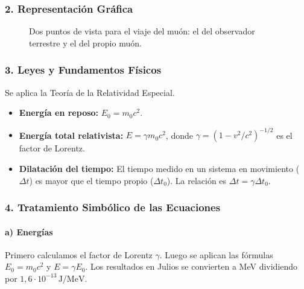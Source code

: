 \subsubsection*{2. Representación Gráfica}
\begin{figure}[H]
    \centering
    \caption{Dos puntos de vista para el viaje del muón: el del observador terrestre y el del propio muón.}
\end{figure}

\subsubsection*{3. Leyes y Fundamentos Físicos}
Se aplica la Teoría de la Relatividad Especial.
\begin{itemize}
    \item \textbf{Energía en reposo:} $E_0 = m_0c^2$.
    \item \textbf{Energía total relativista:} $E = \gamma m_0c^2$, donde $\gamma = (1-v^2/c^2)^{-1/2}$ es el factor de Lorentz.
    \item \textbf{Dilatación del tiempo:} El tiempo medido en un sistema en movimiento ($\Delta t$) es mayor que el tiempo propio ($\Delta t_0$). La relación es $\Delta t = \gamma \Delta t_0$.
\end{itemize}

\subsubsection*{4. Tratamiento Simbólico de las Ecuaciones}
\paragraph*{a) Energías}
Primero calculamos el factor de Lorentz $\gamma$. Luego se aplican las fórmulas $E_0 = m_0c^2$ y $E = \gamma E_0$. Los resultados en Julios se convierten a MeV dividiendo por $1,6\cdot10^{-13}\,\text{J/MeV}$.
